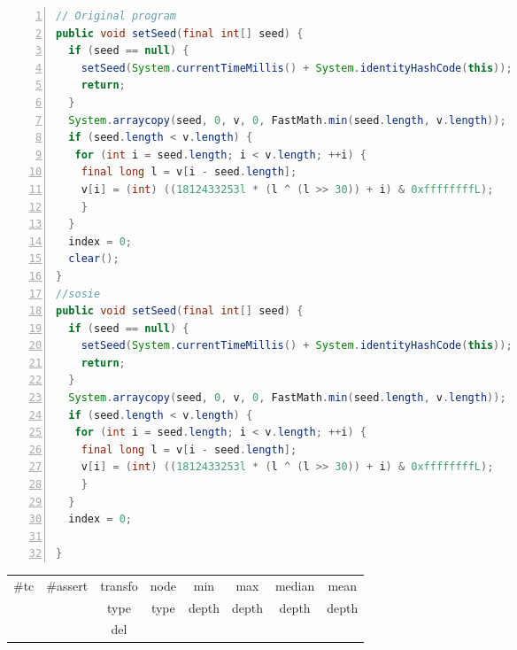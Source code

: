 \begin{minipage}{\columnwidth}
\begin{lstlisting}[caption={Two variants of \texttt{setSeed} in commons.maths},language=java,numbers=left]
// Original program
public void setSeed(final int[] seed) {
  if (seed == null) {
    setSeed(System.currentTimeMillis() + System.identityHashCode(this));
    return;
  }
  System.arraycopy(seed, 0, v, 0, FastMath.min(seed.length, v.length));
  if (seed.length < v.length) {
   for (int i = seed.length; i < v.length; ++i) {
    final long l = v[i - seed.length];
    v[i] = (int) ((1812433253l * (l ^ (l >> 30)) + i) & 0xffffffffL);
    }
  }
  index = 0;
  clear();
}
//sosie
public void setSeed(final int[] seed) {
  if (seed == null) {
    setSeed(System.currentTimeMillis() + System.identityHashCode(this));
    return;
  }
  System.arraycopy(seed, 0, v, 0, FastMath.min(seed.length, v.length));
  if (seed.length < v.length) {
   for (int i = seed.length; i < v.length; ++i) {
    final long l = v[i - seed.length];
    v[i] = (int) ((1812433253l * (l ^ (l >> 30)) + i) & 0xffffffffL);
    }
  }
  index = 0;

}
\end{lstlisting}
\tabcolsep=0.11cm
\begin{tabular}{>{\small}c>{\small}c>{\small}c>{\small}c>{\small}c>{\small}c>{\small}c>{\small}c}
\hline
\rowcolor{lightgray} \#tc & \#assert & transfo & node & min & max & median & mean   \\
\rowcolor{lightgray}  & & type & type & depth  & depth & depth & depth  \\ 
\hline
&  & del &  &  &  &  & \\
\hline
\end{tabular}
\end{minipage}